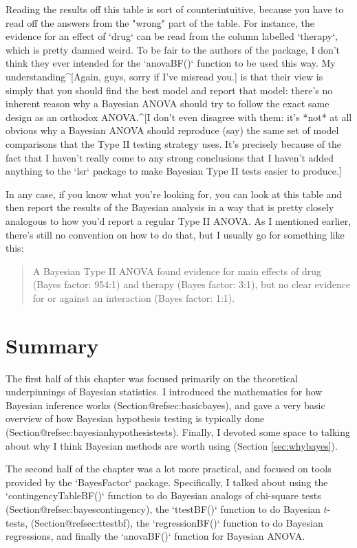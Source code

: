 Reading the results off this table is sort of counterintuitive, because you have to read off the answers from the "wrong" part of the table. For instance, the evidence for an effect of `drug` can be read from the column labelled `therapy`, which is pretty damned weird. To be fair to the authors of the package, I don't think they ever intended for the `anovaBF()` function to be used this way. My understanding^[Again, guys, sorry if I've misread you.] is that their view is simply that you should find the best model and report that model: there's no inherent reason why a Bayesian ANOVA should try to follow the exact same design as an orthodox ANOVA.^[I don't even disagree with them: it's *not* at all obvious why a Bayesian ANOVA should reproduce (say) the same set of model comparisons that the Type II testing strategy uses. It's precisely because of the fact that I haven't really come to any strong conclusions that I haven't added anything to the `lsr` package to make Bayesian Type II tests easier to produce.]

In any case, if you know what you're looking for, you can look at this table and then report the results of the Bayesian analysis in a way that is pretty closely analogous to how you'd report a regular Type II ANOVA. As I mentioned earlier, there's still no convention on how to do that, but I usually go for something like this:

\begin{quote}
A Bayesian Type II ANOVA found evidence for main effects of drug (Bayes factor: 954:1) and therapy (Bayes factor: 3:1), but no clear evidence for or against an interaction (Bayes factor: 1:1). 
\end{quote}


\section{Summary}

The first half of this chapter was focused primarily on the theoretical underpinnings of Bayesian statistics. I introduced the mathematics for how Bayesian inference works (Section@refsec:basicbayes), and gave a very basic overview of how Bayesian hypothesis testing is typically done (Section@refsec:bayesianhypothesistests). Finally, I devoted some space to talking about why I think Bayesian methods are worth using (Section \ref{sec:whybayes}).

The second half of the chapter was a lot more practical, and focused on tools provided by the `BayesFactor` package. Specifically, I talked about using the `contingencyTableBF()` function to do Bayesian analogs of chi-square tests (Section@refsec:bayescontingency), the `ttestBF()` function to do Bayesian $t$-tests, (Section@refsec:ttestbf), the `regressionBF()` function to do Bayesian regressions, and finally the `anovaBF()` function for Bayesian ANOVA. 

